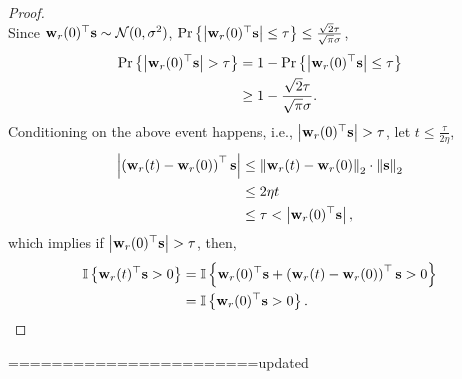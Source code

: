 \begin{proof}
\begin{equation*}
\end{equation*}
Since ${\mathbf{w}}_r(0)^\top {\mathbf{s}} \sim {\mathcal{N}}(0, \sigma^2)$, $\operatorname*{Pr}\left\{ \left| {\mathbf{w}}_r(0)^\top {\mathbf{s}} \right| \le \tau\right\} \le  \frac{\sqrt{2}\tau}{\sqrt{\pi}\sigma}$,
\begin{equation*}
\begin{split}
	\operatorname*{Pr}\left\{ \left| {\mathbf{w}}_r(0)^\top {\mathbf{s}} \right| > \tau\right\} &= 1 - \operatorname*{Pr}\left\{ \left| {\mathbf{w}}_r(0)^\top {\mathbf{s}} \right| \le \tau\right\} \\
	&\ge 1 - \frac{\sqrt{2}\tau}{\sqrt{\pi}\sigma}.
\end{split}
\end{equation*}
Conditioning on the above event happens, i.e., $ \left| {\mathbf{w}}_r(0)^\top {\mathbf{s}} \right| > \tau$, let $t \le \frac{\tau}{ 2 \eta }$,
\begin{equation*}
\begin{split}
	\left| \left( {\mathbf{w}}_r(t) - {\mathbf{w}}_r(0) \right)^\top {\mathbf{s}} \right| &\le \left\| {\mathbf{w}}_r(t) - {\mathbf{w}}_r(0) \right\|_2 \cdot \left\| {\mathbf{s}} \right\|_2 \\
	&\le 2 \eta t \\
	&\le \tau < \left| {\mathbf{w}}_r(0)^\top {\mathbf{s}} \right|,
\end{split}
\end{equation*}
which implies if $\left| {\mathbf{w}}_r(0)^\top {\mathbf{s}} \right| > \tau$, then,
\begin{equation*}
\begin{split}
	{\mathbb{I}}\left\{ {\mathbf{w}}_r(t)^\top {\mathbf{s}} > 0 \right\} &= {\mathbb{I}}\left\{ {\mathbf{w}}_r(0)^\top {\mathbf{s}}  + \left( {\mathbf{w}}_r(t) - {\mathbf{w}}_r(0) \right)^\top {\mathbf{s}} > 0 \right\} \\
	&= {\mathbb{I}}\left\{ {\mathbf{w}}_r(0)^\top {\mathbf{s}} > 0 \right\}. \qedhere
\end{split}
\end{equation*}
\end{proof}

=======================updated

